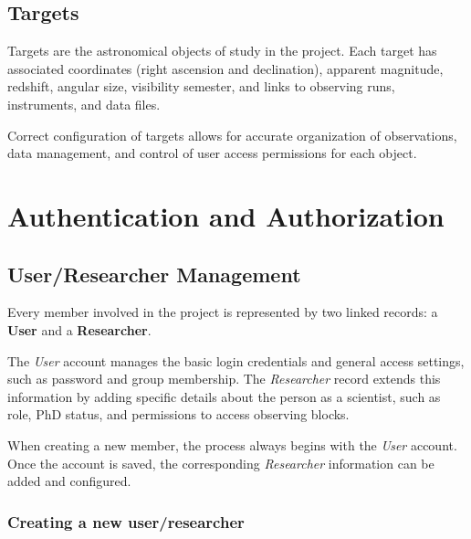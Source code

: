 \subsection{Targets}

Targets are the astronomical objects of study in the project. Each target has associated coordinates (right ascension and declination), apparent magnitude, redshift, angular size, visibility semester, and links to observing runs, instruments, and data files.

\addimage

Correct configuration of targets allows for accurate organization of observations, data management, and control of user access permissions for each object.


\section{Authentication and Authorization}

\subsection{User/Researcher Management}

Every member involved in the project is represented by two linked records: a \textbf{User} and a \textbf{Researcher}.

The \textsl{User} account manages the basic login credentials and general access settings, such as password and group membership. The \textsl{Researcher} record extends this information by adding specific details about the person as a scientist, such as role, PhD status, and permissions to access observing blocks.

When creating a new member, the process always begins with the \textsl{User} account. Once the account is saved, the corresponding \textsl{Researcher} information can be added and configured.


\subsubsection{Creating a new user/researcher}


